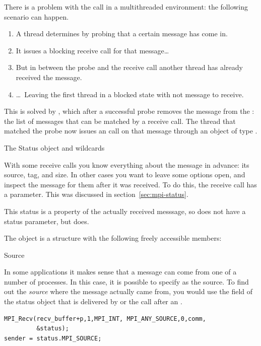 There is a problem with the  call in a
multithreaded environment: the following scenario can happen.
\begin{enumerate}
\item A thread determines by probing that a certain message has come
  in.
\item It issues a blocking receive call for that message\dots
\item But in between the probe and the receive call another thread
  has already received the message.
\item \dots~Leaving the first thread in a blocked state with not
  message to receive.
\end{enumerate}
This is solved by , which after a successful
probe removes the message from the : the
list of messages that can be matched by a receive call. The thread
that matched the probe now issues an  call on
that message through an object of type .



 {The Status object and wildcards}
\label{sec:mpi-wildcard}

With some receive calls you know everything about the message in advance:
its source, tag, and size. In other cases you want to leave some options
open, and inspect the message for them after it was received.
To do this, the receive call has a 
parameter. This was discussed in section~\ref{sec:mpi-status}.

This status is a property of the actually received messsage, so 
does not have a status parameter, but  does.

The  object
is a structure with the following
freely accessible members:

 {Source}

In some applications it makes sense that a message can come from 
one of a number of processes. In this case, it is possible to specify
 as the source.
%
To find out the \emph{source}
where the message actually
came from, you would use the  field of the status object
that is delivered by  or the  call after an .
\begin{lstlisting}
MPI_Recv(recv_buffer+p,1,MPI_INT, MPI_ANY_SOURCE,0,comm,
         &status);
sender = status.MPI_SOURCE;
\end{lstlisting}

